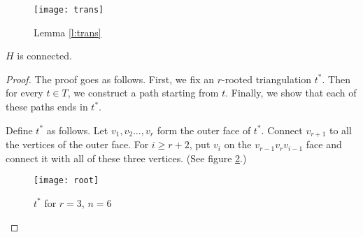\begin{figure}[ht]
  \centering
  \texttt{[image: trans]}
  \caption{Lemma \ref{l:trans}}
  \label{fig:trans}
\end{figure}

\begin{thm}
  $H$ is connected.
\end{thm}
\begin{proof}
  The proof goes as follows. First, we fix an $r$-rooted triangulation $t^*$. Then
  for every $t \in T$, we construct a path starting from $t$. Finally,
  we show that each of these paths ends in $t^*$.

  Define $t^*$ as follows. Let $v_1, v_2 \dots, v_r$ form the outer face of $t^*$.
  Connect $v_{r+1}$ to all the vertices of the outer face. For $i \ge r + 2$,
  put $v_i$ on the $v_{r-1}v_rv_{i-1}$ face and connect it with all of these three vertices.
  (See figure \ref{fig:root}.)

  \begin{figure}[ht]
    \centering
    \texttt{[image: root]}
    \caption{$t^*$ for $r=3$, $n = 6$}
    \label{fig:root}
  \end{figure}


\end{proof}
